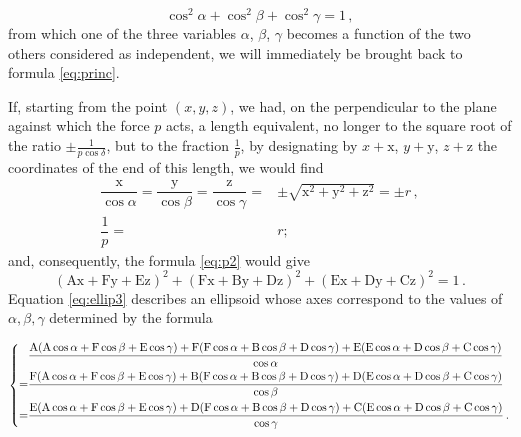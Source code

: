 \documentclass[leqno,openright,smallroyalvopaper,8pt,twoside,showtrims]{memoir}
\begin{document}
\begin{equation}
\cos^2\alpha+\cos^2\beta+\cos^2\gamma = 1\,,
\end{equation}
from which one of the three variables $\alpha$, $\beta$, $\gamma$ becomes a function of the two others considered as independent, we will immediately be brought back to formula \eqref{eq:princ}.

If, starting from the point $(x, y, z)$, we had, on the perpendicular to the plane against which the force $p$ acts, a length equivalent, no longer to the square root of the ratio $\pm \frac{1}{p\cos\delta}$, but to the fraction $\frac{1}{p}$, by designating by $x + \text{x}$, $y + \text{y}$, $z+ \text{z}$ the coordinates of the end of this length, we would find
\begin{equation}\label{eq:ellip4}
\begin{aligned}
\dfrac{\text{x}}{\cos\alpha}=\dfrac{\text{y}}{\cos\beta}=\dfrac{\text{z}}{\cos\gamma}=&\pm\sqrt{\text{x}^2+\text{y}^2+\text{z}^2}=\pm r\,,\\
\dfrac{1}{p}=&r;
\end{aligned}
\end{equation}
and, consequently, the formula \eqref{eq:p2} would give
\begin{equation}\label{eq:ellip3}
(\text{Ax}+\text{Fy}+\text{Ez})^2+(\text{Fx}+\text{By}+\text{Dz})^2+(\text{Ex}+\text{Dy}+\text{Cz})^2 = 1\,.
\end{equation}
Equation \eqref{eq:ellip3} describes an ellipsoid whose axes correspond to the values of $\alpha,\beta,\gamma$ determined by the formula

\begin{scriptsize}
\begin{equation}
\begin{dcases}
\begin{aligned}
&\dfrac{\text{A}(\text{A}\cos\alpha+\text{F}\cos\beta+\text{E}\cos\gamma)+\text{F}(\text{F}\cos\alpha+\text{B}\cos\beta+\text{D}\cos\gamma)+\text{E}(\text{E}\cos\alpha+\text{D}\cos\beta+\text{C}\cos\gamma)}{\cos\alpha}\\
=&\dfrac{\text{F}(\text{A}\cos\alpha+\text{F}\cos\beta+\text{E}\cos\gamma)+\text{B}(\text{F}\cos\alpha+\text{B}\cos\beta+\text{D}\cos\gamma)+\text{D}(\text{E}\cos\alpha+\text{D}\cos\beta+\text{C}\cos\gamma)}{\cos\beta}\\
=&\dfrac{\text{E}(\text{A}\cos\alpha+\text{F}\cos\beta+\text{E}\cos\gamma)+\text{D}(\text{F}\cos\alpha+\text{B}\cos\beta+\text{D}\cos\gamma)+\text{C}(\text{E}\cos\alpha+\text{D}\cos\beta+\text{C}\cos\gamma)}{\cos\gamma}\,.
\end{aligned}
\end{dcases}
\end{equation}
\end{scriptsize}
\end{document}
